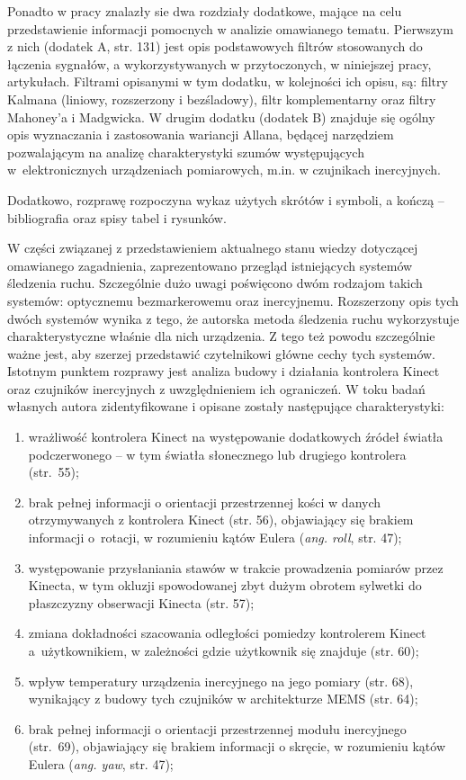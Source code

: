 \documentclass[10pt,a4paper]{article}
\begin{document}
Ponadto w pracy znalazły sie dwa rozdziały dodatkowe, mające na celu przedstawienie informacji pomocnych w analizie omawianego tematu. Pierwszym z nich (dodatek A, str. 131) jest opis podstawowych filtrów stosowanych do łączenia sygnałów, a wykorzystywanych w przytoczonych, w niniejszej pracy, artykułach. Filtrami opisanymi w tym dodatku, w kolejności ich opisu, są: filtry Kalmana (liniowy, rozszerzony i bezśladowy), filtr komplementarny oraz filtry Mahoney’a i Madgwicka. W drugim dodatku (dodatek B) znajduje się ogólny opis wyznaczania i zastosowania wariancji Allana, będącej narzędziem pozwalającym na analizę charakterystyki szumów występujących w~elektronicznych urządzeniach pomiarowych, m.in. w czujnikach inercyjnych.

Dodatkowo, rozprawę rozpoczyna wykaz użytych skrótów i symboli, a kończą -- bibliografia oraz spisy tabel i rysunków.

W części związanej z przedstawieniem aktualnego stanu wiedzy dotyczącej omawianego zagadnienia, zaprezentowano przegląd istniejących systemów śledzenia ruchu. Szczególnie dużo uwagi poświęcono dwóm rodzajom takich systemów: optycznemu bezmarkerowemu oraz inercyjnemu. Rozszerzony opis tych dwóch systemów wynika z tego, że autorska metoda śledzenia ruchu wykorzystuje charakterystyczne właśnie dla nich urządzenia. Z tego też powodu szczególnie ważne jest, aby szerzej przedstawić czytelnikowi główne cechy tych systemów. Istotnym punktem rozprawy jest analiza budowy i działania kontrolera Kinect oraz czujników inercyjnych z uwzględnieniem ich ograniczeń. W toku badań własnych autora zidentyfikowane i opisane zostały następujące charakterystyki:

\begin{enumerate}
	\item wrażliwość kontrolera Kinect na występowanie dodatkowych źródeł światła podczerwonego -- w tym światła słonecznego lub drugiego kontrolera (str.~55);
	\item brak pełnej informacji o orientacji przestrzennej kości w danych otrzymywanych z kontrolera Kinect (str. 56), objawiający się brakiem informacji o~rotacji, w rozumieniu kątów Eulera (\emph{ang. roll}, str. 47);
	\item występowanie przysłaniania stawów w trakcie prowadzenia pomiarów przez Kinecta, w tym okluzji spowodowanej zbyt dużym obrotem sylwetki do płaszczyzny obserwacji Kinecta (str. 57);
	\item zmiana dokładności szacowania odległości pomiedzy kontrolerem Kinect a~użytkownikiem, w zależności gdzie użytkownik się znajduje (str. 60);
	\item wpływ temperatury urządzenia inercyjnego na jego pomiary (str. 68), wynikający z budowy tych czujników w architekturze MEMS (str. 64);
	\item brak pełnej informacji o orientacji przestrzennej modułu inercyjnego (str.~69), objawiający się brakiem informacji o skręcie, w rozumieniu kątów Eulera (\emph{ang. yaw}, str. 47);
\end{enumerate}
\end{document}
